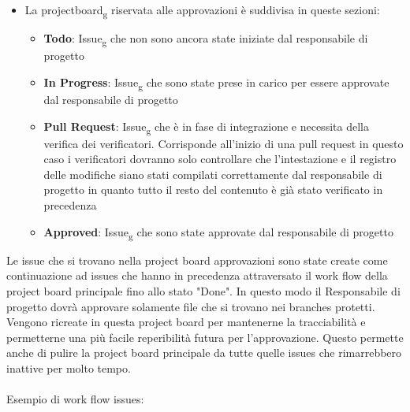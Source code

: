 \begin{itemize}
	\item La projectboard\textsubscript{g} riservata alle approvazioni è suddivisa in queste sezioni:
	\begin{itemize}
		\item \textbf{Todo}: Issue\textsubscript{g} che non sono ancora state iniziate dal responsabile di progetto
		\item \textbf{In Progress}: Issue\textsubscript{g}  che sono state prese in carico per essere approvate dal responsabile di progetto
		\item \textbf{Pull Request}: Issue\textsubscript{g} che è in fase di integrazione e necessita della verifica dei verificatori. Corrisponde all'inizio di una pull request
		in questo caso i verificatori dovranno solo controllare che l'intestazione e il registro delle modifiche siano stati compilati correttamente dal responsabile di progetto in quanto tutto il resto del contenuto è già stato verificato in precedenza
		\item \textbf{Approved}: Issue\textsubscript{g} che sono state approvate dal responsabile di progetto
	\end{itemize}
\end{itemize}
Le issue che si trovano nella project board approvazioni sono state create come continuazione ad issues che hanno in precedenza attraversato il work flow della project board principale fino allo stato "Done".
In questo modo il Responsabile di progetto dovrà approvare solamente file che si trovano nei branches protetti.
Vengono ricreate in questa project board per  mantenerne la tracciabilità e permetterne una più facile reperibilità futura per l'approvazione.
Questo permette anche di pulire la project board principale da tutte quelle issues che rimarrebbero inattive per molto tempo.
\\\\
Esempio di work flow issues:
